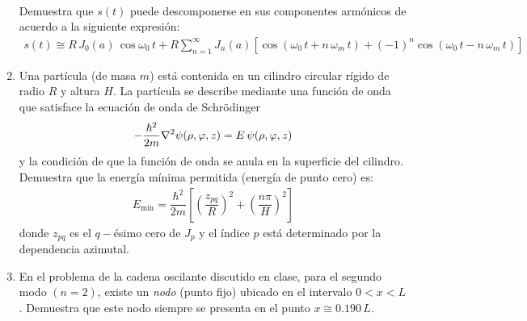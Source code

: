 \begin{enumerate}
\begin{align*}
\end{align*}
Demuestra que $s(t)$ puede descomponerse en sus componentes armónicos de acuerdo a la siguiente expresión:
\begin{align*}
s(t) \cong R \, J_{0}(a) \, \cos \omega_{0} \, t + R \sum_{n=1}^{\infty} J_{n} (a) [\cos (\omega_{0} \, t + n \, \omega_{m} \, t) + (-1)^{n} \cos (\omega_{0} \, t - n \, \omega_{m} \, t) ]
\end{align*}
\item Una partícula (de masa $m$) está contenida en un cilindro circular rígido de radio $R$ y altura $H$. La partícula se describe mediante una función de onda que satisface la ecuación de onda de Schrödinger
\begin{align*}
- \dfrac{\hbar^{2}}{2 m} \laplacian \psi(\rho, \varphi, z) = E \, \psi(\rho, \varphi, z)
\end{align*}
y la condición de que la función de onda se anula en la superficie del cilindro. Demuestra que la energía mínima permitida (energía de punto cero) es:
\begin{align*}
E_{\text{min}} = \dfrac{\hbar^{2}}{2 m} \left[ \left( \dfrac{z_{pq}}{R} \right)^{2} + \left( \dfrac{n \pi}{H} \right)^{2} \right]
\end{align*}
donde $z_{pq}$ es el $q-$ésimo cero de $J_{p}$ y el índice $p$ está determinado por la dependencia azimutal.
\item En el problema de la cadena oscilante discutido en clase, para el segundo modo $(n=2)$, existe un \emph{nodo} (punto fijo) ubicado en el intervalo $0 < x < L$. Demuestra que este nodo siempre se presenta en el punto $x \cong 0.190 \, L$.
\end{enumerate}
